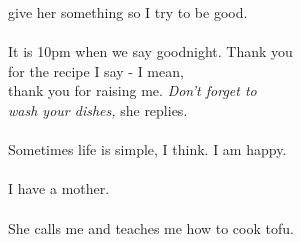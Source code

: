 \begin{Parallel}{0.48\textwidth}{0.48\textwidth}
{give her something so I try to be good.\\
\-\ \\It is 10pm when we say goodnight. Thank you \\
for the recipe I say - I mean, \\
thank you for raising me. \emph{Don't forget to} \\
\emph{wash your dishes,} she replies.\\
\-\ \\Sometimes life is simple, I think. I am happy.\\
\-\ \\I have a mother.\\
\-\ \\She calls me and teaches me how to cook tofu.}
\ParallelPar
\end{Parallel}
\vfill
\hspace{0pt}